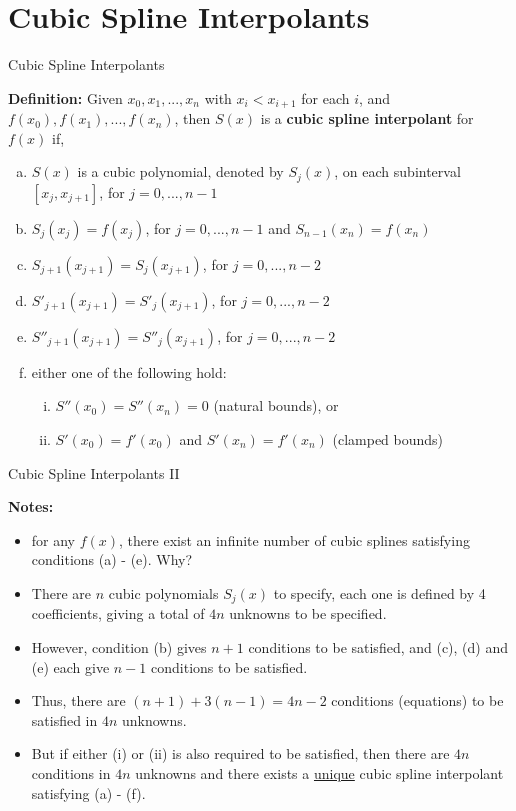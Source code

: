 \documentclass[12pt]{beamer}
\begin{document}
\section{Cubic Spline Interpolants}

\begin{frame}{Cubic Spline Interpolants}

{\bf Definition:} Given $x_0,x_1,...,x_n$ with $x_i < x_{i+1}$ for each $i$, and $f(x_0), f(x_1), ..., f(x_n)$, then $S(x)$ is a {\bf cubic spline interpolant} for $f(x)$ if,

\begin{enumerate}[(a)]
\item{$S(x)$ is a cubic polynomial, denoted by $S_j(x)$, on each subinterval $[x_j,x_{j+1}]$, for $j=0,...,n-1$}
\item{$S_j(x_j)=f(x_j)$, for $j=0,...,n-1$ and $S_{n-1}(x_n)=f(x_n)$}
\item{$S_{j+1}(x_{j+1})=S_j(x_{j+1})$, for $j=0,...,n-2$}
\item{$S'_{j+1}(x_{j+1})=S'_j(x_{j+1})$, for $j=0,...,n-2$}
\item{$S''_{j+1}(x_{j+1})=S''_j(x_{j+1})$, for $j=0,...,n-2$}
\item{either one of the following hold:}
\begin{enumerate}[(i)]
\item{$S''(x_0)=S''(x_n)=0$ (natural bounds), or}
\item{$S'(x_0)=f'(x_0)$ and $S'(x_n)=f'(x_n)$ (clamped bounds)}
\end{enumerate}
\end{enumerate}

\end{frame}

\begin{frame}{Cubic Spline Interpolants II}

{\bf Notes:}
\begin{itemize}
\item{for any $f(x)$, there exist an infinite number of cubic splines satisfying conditions (a) - (e). Why?}
\item{There are $n$ cubic polynomials $S_j(x)$ to specify, each one is defined by 4 coefficients, giving a total of $4n$ unknowns to be specified.}
\item{However, condition (b) gives $n+1$ conditions to be satisfied, and (c), (d) and (e) each give $n-1$ conditions to be satisfied.}
\item{Thus, there are $(n+1)+3(n-1)=4n-2$ conditions (equations) to be satisfied in $4n$ unknowns.}
\item{But if either (i) or (ii) is also required to be satisfied, then there are $4n$ conditions in $4n$ unknowns and there exists a \underline{unique} cubic spline interpolant satisfying (a) - (f).}
\end{itemize}
\end{frame}
\end{document}
